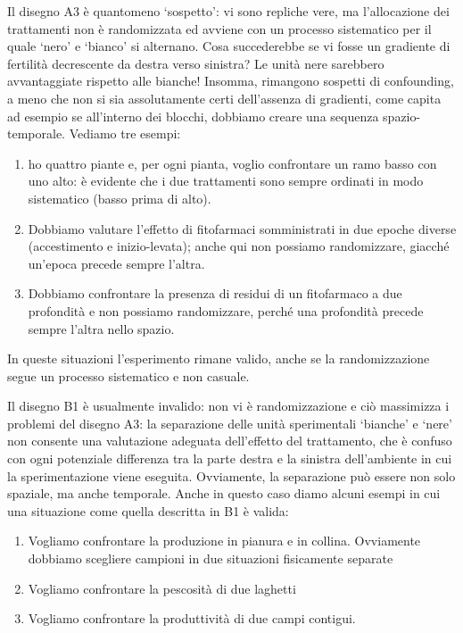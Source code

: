\documentclass[a4paper,12pt,oneside]{book}
\providecommand{\tightlist}{%
  \setlength{\itemsep}{0pt}\setlength{\parskip}{0pt}}
\begin{document}
Il disegno A3 è quantomeno `sospetto': vi sono repliche vere, ma l'allocazione dei trattamenti non è randomizzata ed avviene con un processo sistematico per il quale `nero' e `bianco' si alternano. Cosa succederebbe se vi fosse un gradiente di fertilità decrescente da destra verso sinistra? Le unità nere sarebbero avvantaggiate rispetto alle bianche! Insomma, rimangono sospetti di confounding, a meno che non si sia assolutamente certi dell'assenza di gradienti, come capita ad esempio se all'interno dei blocchi, dobbiamo creare una sequenza spazio-temporale. Vediamo tre esempi:

\begin{enumerate}
\def\labelenumi{\arabic{enumi}.}
\tightlist
\item
  ho quattro piante e, per ogni pianta, voglio confrontare un ramo basso con uno alto: è evidente che i due trattamenti sono sempre ordinati in modo sistematico (basso prima di alto).
\item
  Dobbiamo valutare l'effetto di fitofarmaci somministrati in due epoche diverse (accestimento e inizio-levata); anche qui non possiamo randomizzare, giacché un'epoca precede sempre l'altra.
\item
  Dobbiamo confrontare la presenza di residui di un fitofarmaco a due profondità e non possiamo randomizzare, perché una profondità precede sempre l'altra nello spazio.
\end{enumerate}

In queste situazioni l'esperimento rimane valido, anche se la randomizzazione segue un processo sistematico e non casuale.

Il disegno B1 è usualmente invalido: non vi è randomizzazione e ciò massimizza i problemi del disegno A3: la separazione delle unità sperimentali `bianche' e `nere' non consente una valutazione adeguata dell'effetto del trattamento, che è confuso con ogni potenziale differenza tra la parte destra e la sinistra dell'ambiente in cui la sperimentazione viene eseguita. Ovviamente, la separazione può essere non solo spaziale, ma anche temporale. Anche in questo caso diamo alcuni esempi in cui una situazione come quella descritta in B1 è valida:

\begin{enumerate}
\def\labelenumi{\arabic{enumi}.}
\tightlist
\item
  Vogliamo confrontare la produzione in pianura e in collina. Ovviamente dobbiamo scegliere campioni in due situazioni fisicamente separate
\item
  Vogliamo confrontare la pescosità di due laghetti
\item
  Vogliamo confrontare la produttività di due campi contigui.
\end{enumerate}
\end{document}
